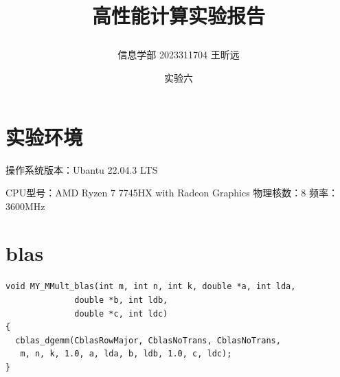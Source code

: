 \documentclass{article} %
\begin{document}
    \title{\centerline{高性能计算实验报告}}
    \date{实验六}
    \author{信息学部 2023311704 王昕远}
    \maketitle
    \thispagestyle{empty}






\section{实验环境}
操作系统版本：Ubantu 22.04.3 LTS\par
CPU型号：AMD Ryzen 7 7745HX with Radeon Graphics 物理核数：8 频率：3600MHz\par

\section{blas}
\begin{verbatim}
void MY_MMult_blas(int m, int n, int k, double *a, int lda,
              double *b, int ldb,
              double *c, int ldc)
{
  cblas_dgemm(CblasRowMajor, CblasNoTrans, CblasNoTrans,    
   m, n, k, 1.0, a, lda, b, ldb, 1.0, c, ldc);
}
    \end{verbatim}
    
\end{document}

